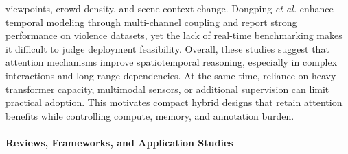 \documentclass[AMA,Times1COL]{WileyNJDv5} %
\begin{document}
viewpoints, crowd density, and scene context change. Dongping \textit{et al.} \cite{b22} enhance temporal modeling through multi-channel coupling and report strong performance on violence datasets, yet the lack of real-time benchmarking makes it difficult to judge deployment feasibility. Overall, these studies suggest that attention mechanisms improve spatiotemporal reasoning, especially in complex interactions and long-range dependencies. At the same time, reliance on heavy transformer capacity, multimodal sensors, or additional supervision can limit practical adoption. This motivates compact hybrid designs that retain attention benefits while controlling compute, memory, and annotation burden.


\paragraph{Reviews, Frameworks, and Application Studies}
\end{document}
